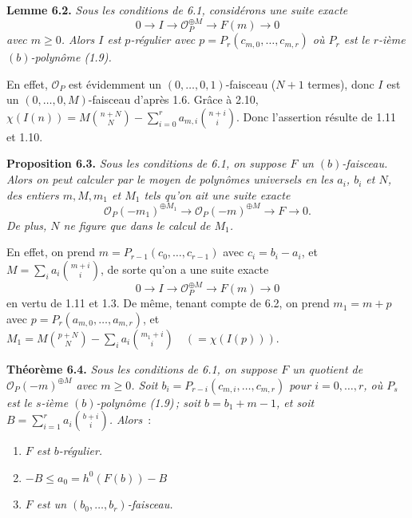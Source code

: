 \textbf{Lemme 6.2.} \emph{Sous les conditions de 6.1, consid\'erons une suite exacte}
\[
   0\longrightarrow I\longrightarrow \mathcal O_P^{\oplus M}\longrightarrow F(m)\longrightarrow0
\]
\emph{avec $m\ge0$. Alors $I$ est $p$-r\'egulier avec \(p=P_r(c_{m,0},\ldots,c_{m,r})\) o\`u $P_r$ est le $r$-i\`eme $(b)$-polyn\^ome (1.9).}

En effet, $\mathcal O_P$ est \'evidemment un $(0,\ldots,0,1)$-faisceau ($N+1$ termes), donc $I$ est un $(0,\ldots,0,M)$-faisceau d'apr\`es 1.6. Gr\^ace \`a 2.10, \(\chi(I(n))=M\binom{n+N}{N}-\sum_{i=0}^{r} a_{m,i}\binom{n+i}{i}\). Donc l'assertion r\'esulte de 1.11 et 1.10.

\textbf{Proposition 6.3.} \emph{Sous les conditions de 6.1, on suppose $F$ un $(b)$-faisceau. Alors on peut calculer par le moyen de polyn\^omes universels en les $a_i$, $b_i$ et $N$, des entiers $m, M, m_1$ et $M_1$ tels qu'on ait une suite exacte}
\[
   \mathcal O_P(-m_1)^{\oplus M_1}\longrightarrow
   \mathcal O_P(-m)^{\oplus M}\longrightarrow F\longrightarrow0.
\]
\emph{De plus, $N$ ne figure que dans le calcul de $M_1$.}

En
effet, on prend $m=P_{r-1}(c_0,\ldots,c_{r-1})$ avec $c_i=b_i-a_i$, et $M=\sum_i a_i\binom{m+i}{i}$, de sorte qu'on a une suite exacte
\[
   0\longrightarrow I\longrightarrow \mathcal O_P^{\oplus M}
   \longrightarrow F(m)\longrightarrow0
\]
en vertu de 1.11 et 1.3. De m\^eme, tenant compte de 6.2, on prend $m_1=m+p$ avec $p=P_r(a_{m,0},\ldots,a_{m,r})$, et $M_1=M\binom{p+N}{N}-\sum_i a_i\binom{m_1+i}{i}\quad(=\chi(I(p)))$.

\textbf{Th\'eor\`eme 6.4.} \emph{Sous les conditions de 6.1, on suppose $F$ un quotient de $\mathcal O_P(-m)^{\oplus M}$ avec $m\ge0$. Soit $b_i=P_{r-i}(c_{m,i},\ldots,c_{m,r})$ pour $i=0,\ldots,r$, o\`u $P_s$ est le $s$-i\`eme $(b)$-polyn\^ome (1.9)\,; soit $b=b_1+m-1$, et soit $B=\sum_{i=1}^{r} a_i\binom{b+i}{i}$. Alors}~:
\begin{enumerate}[label=(\roman*)]
\item \emph{$F$ est $b$-r\'egulier.}
\item \emph{$-B\le a_0=h^0(F(b))-B$}
\item \emph{$F$ est un $(b_0,\ldots,b_r)$-faisceau.}
\end{enumerate}

